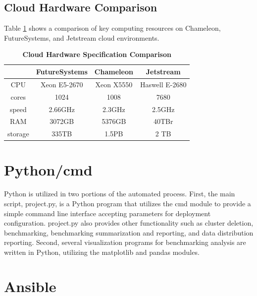 \documentclass[9pt,twocolumn,twoside]{../../styles/osajnl}
\begin{document}
\subsection{Cloud Hardware Comparison}


Table \ref{tab:cloud-comparison} shows a comparison of key computing resources on Chameleon, FutureSystems, and Jetstream cloud environments.

\begin{table}[htbp]
\centering
\caption{\bf Cloud Hardware Specification Comparison \cite{www-chamHardware} \cite{www-kiloHardware} \cite{www-jetHardware}}

 \begin{tabular} {| c | c | c | c |}
\hline
  & FutureSystems &  Chameleon  & Jetstream \\ [0.5ex] 
 \hline

    
CPU     &     Xeon E5-2670 & Xeon X5550 & Haswell E-2680  \\
 \hline
cores &  1024             &        1008   &  7680 \\
 \hline
speed     &   2.66GHz           &               2.3GHz & 2.5GHz\\
 \hline
RAM   &     3072GB            &               5376GB  &  40TBr\\
 \hline
storage     &     335TB     &                   1.5PB  & 2 TB\\ [1ex] 
 \hline

\end{tabular}
  \label{tab:cloud-comparison}
\end{table}

\section{Python/cmd}

Python is utilized in two portions of the automated process.  First, the main script, project.py, is a Python program that utilizes the cmd module to provide a simple command line interface \cite{www-cmd} accepting parameters for deployment configuration.  project.py also provides other functionality such as cluster deletion, benchmarking, benchmarking summarization and reporting, and data distribution reporting.  Second, several visualization programs for benchmarking analysis are written in Python, utilizing the matplotlib and pandas modules.

\section{Ansible}
\end{document}

